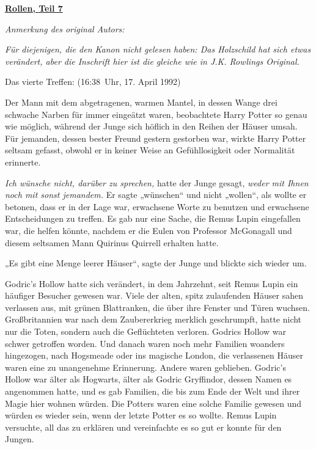 

\hypertarget{rollen-teil-7}{%

\textbf{\uline{Rollen, Teil 7}}

\emph{Anmerkung des original Autors:}

\emph{Für diejenigen, die den Kanon nicht gelesen haben: Das Holzschild hat sich etwas verändert, aber die Inschrift hier ist die gleiche wie in J.K. Rowlings Original.}

Das vierte Treffen: (16:38~Uhr, 17. April 1992)

Der Mann mit dem abgetragenen, warmen Mantel, in dessen Wange drei schwache Narben für immer eingeätzt waren, beobachtete Harry Potter so genau wie möglich, während der Junge sich höflich in den Reihen der Häuser umsah. Für jemanden, dessen bester Freund gestern gestorben war, wirkte Harry Potter seltsam gefasst, obwohl er in keiner Weise an Gefühllosigkeit oder Normalität erinnerte.

\emph{Ich wünsche nicht, darüber zu sprechen,} hatte der Junge gesagt, \emph{weder mit Ihnen noch mit sonst jemandem.} Er sagte „wünschen“ und nicht „wollen“, als wollte er betonen, dass er in der Lage war, erwachsene Worte zu benutzen und erwachsene Entscheidungen zu treffen. Es gab nur eine Sache, die Remus Lupin eingefallen war, die helfen könnte, nachdem er die Eulen von Professor McGonagall und diesem seltsamen Mann Quirinus Quirrell erhalten hatte.

„Es gibt eine Menge leerer Häuser“, sagte der Junge und blickte sich wieder um.

Godric's Hollow hatte sich verändert, in dem Jahrzehnt, seit Remus Lupin ein häufiger Besucher gewesen war. Viele der alten, spitz zulaufenden Häuser sahen verlassen aus, mit grünen Blattranken, die über ihre Fenster und Türen wuchsen. Großbritannien war nach dem Zaubererkrieg merklich geschrumpft, hatte nicht nur die Toten, sondern auch die Geflüchteten verloren. Godrics Hollow war schwer getroffen worden. Und danach waren noch mehr Familien woanders hingezogen, nach Hogsmeade oder ins magische London, die verlassenen Häuser waren eine zu unangenehme Erinnerung. Andere waren geblieben. Godric's Hollow war älter als Hogwarts, älter als Godric Gryffindor, dessen Namen es angenommen hatte, und es gab Familien, die bis zum Ende der Welt und ihrer Magie hier wohnen würden. Die Potters waren eine solche Familie gewesen und würden es wieder sein, wenn der letzte Potter es so wollte. Remus Lupin versuchte, all das zu erklären und vereinfachte es so gut er konnte für den Jungen.

}
